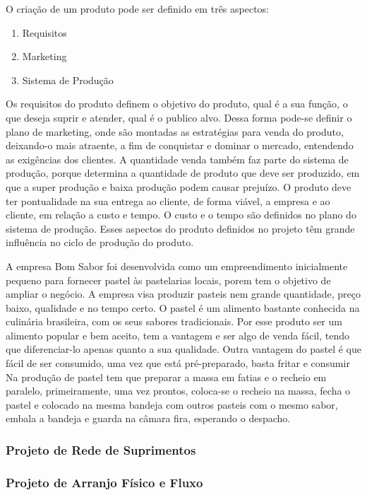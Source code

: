 O criação de um produto pode ser definido em três aspectos:

\begin{enumerate}
\item Requisitos
\item Marketing
\item Sistema de Produção
\end{enumerate}

Os requisitos do produto definem o objetivo do produto, qual é a sua função, o que deseja suprir e atender, qual é o publico alvo. Dessa forma pode-se definir o plano de marketing, onde são montadas as estratégias para venda do produto, deixando-o mais atraente, a fim de conquistar e dominar o mercado, entendendo as exigências dos clientes. A quantidade venda também faz parte do  sistema de produção, porque determina a quantidade de produto que deve ser produzido, em que a super produção e baixa produção podem causar prejuízo.  O produto deve ter pontualidade na sua entrega ao cliente, de forma viável, a empresa e ao cliente, em relação a custo e tempo.  O custo e o tempo são definidos no plano do sistema de produção. Esses aspectos do produto definidos no projeto têm grande influência no ciclo de produção do produto.

A empresa Bom Sabor foi desenvolvida como um empreendimento inicialmente pequeno para fornecer pastel às pastelarias locais, porem tem o objetivo de ampliar o negócio. A empresa visa produzir pasteis nem grande quantidade, preço baixo, qualidade e no tempo certo.
O pastel é um alimento bastante conhecida na culinária brasileira, com os seus sabores tradicionais. Por esse produto ser um alimento popular e bem aceito, tem a vantagem e ser algo de venda fácil, tendo que diferenciar-lo apenas quanto a sua qualidade.  Outra vantagem do pastel é que fácil de ser consumido, uma vez que está pré-preparado, basta fritar e consumir
Na produção de pastel tem que preparar a massa em fatias e o recheio em paralelo, primeiramente, uma vez prontos, coloca-se o recheio na massa, fecha o pastel e colocado na mesma bandeja com outros pasteis com o mesmo sabor, embala a bandeja e guarda na câmara fira, esperando o despacho.

\subsubsection{Projeto de Rede de Suprimentos}

\subsubsection{Projeto de Arranjo Físico e Fluxo}

